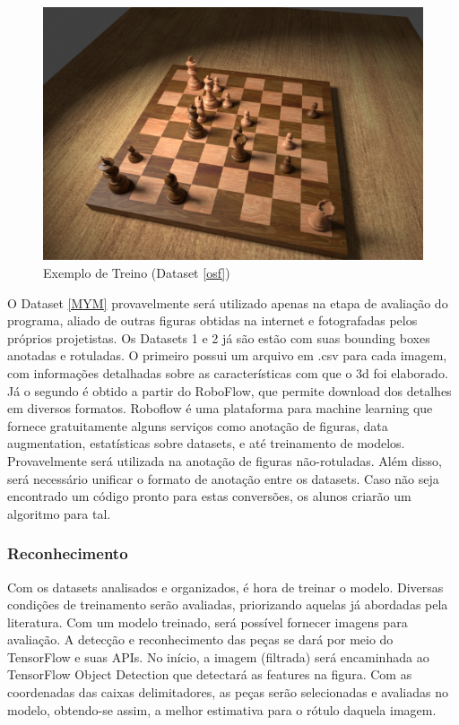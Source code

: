\documentclass[a4paper,12pt,twoside]{article}
\begin{document}
\begin{figure}[h!]
\centering
  \includegraphics[width=0.8\linewidth]{fig/treino.jpg}
  \caption{Exemplo de Treino (Dataset \ref{osf})}
\label{fig:treino}
\end{figure}

O Dataset \ref{MYM} provavelmente será utilizado apenas na etapa de avaliação do programa,
aliado de outras figuras obtidas na internet e fotografadas pelos próprios projetistas.
Os Datasets 1 e 2 já são estão com suas bounding boxes anotadas e rotuladas.
O primeiro possui um arquivo em .csv para cada imagem,
com informações detalhadas sobre as características com que o 3d foi elaborado.
Já o segundo é obtido a partir do RoboFlow, que permite download dos detalhes em diversos formatos.
Roboflow é uma plataforma para machine learning que fornece gratuitamente alguns serviços como anotação de figuras,
data augmentation, estatísticas sobre datasets, e até treinamento de modelos.
Provavelmente será utilizada na anotação de figuras não-rotuladas.
Além disso, será necessário unificar o formato de anotação entre os datasets.
Caso não seja encontrado um código pronto para estas conversões, os alunos criarão um algoritmo para tal.

\subsubsection{Reconhecimento}

Com os datasets analisados e organizados, é hora de treinar o modelo.
Diversas condições de treinamento serão avaliadas, priorizando aquelas já abordadas pela literatura.
Com um modelo treinado, será possível fornecer imagens para avaliação.
A detecção e reconhecimento das peças se dará por meio do TensorFlow e suas APIs.
No início, a imagem (filtrada) será encaminhada ao TensorFlow Object Detection que detectará as features na figura.
Com as coordenadas das caixas delimitadores,
as peças serão selecionadas e avaliadas no modelo, obtendo-se assim, a melhor estimativa para o rótulo daquela imagem.
\end{document}

